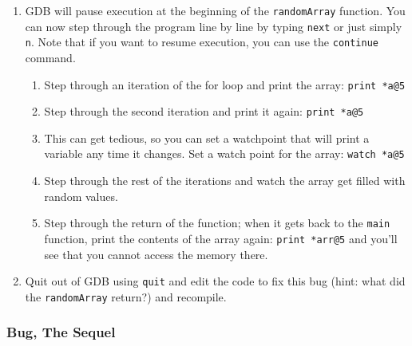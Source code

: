 \documentclass[12pt]{scrartcl}
\begin{document}
\begin{enumerate}
  \item GDB will pause execution at the beginning of the 
  \texttt{randomArray} function.  You can now step through
  the program line by line by typing \texttt{next} or 
  just simply \texttt{n}.  Note that if you want to resume
  execution, you can use the \texttt{continue} command.
  \begin{enumerate}
    \item Step through an iteration of the for loop and print the
    array: \texttt{print *a@5}
    \item Step through the second iteration and print it again:
    \texttt{print *a@5}
    \item This can get tedious, so you can set a watchpoint that
    will print a variable any time it changes.  Set a watch point for
    the array: \texttt{watch *a@5}
    \item Step through the rest of the iterations and watch the
    array get filled with random values. 
    \item Step through the return of the function; when it gets back
    to the \texttt{main} function, print the contents
    of the array again: \texttt{print *arr@5} and you'll 
    see that you cannot access the memory there.  
  \end{enumerate}

  \item Quit out of GDB using \texttt{quit} and edit
  the code to fix this bug (hint: what did the \texttt{randomArray}
  return?) and recompile.
  
\end{enumerate}

\subsubsection*{Bug, The Sequel}
\end{document}
